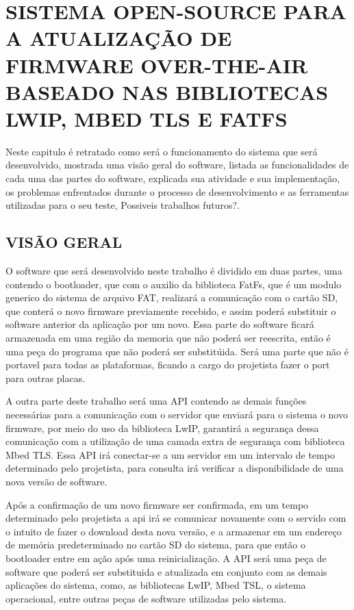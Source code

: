 
\chapter{SISTEMA OPEN-SOURCE PARA A ATUALIZAÇÃO DE FIRMWARE OVER-THE-AIR BASEADO NAS BIBLIOTECAS LWIP, MBED TLS E FATFS}
\label{chap:metodologia}
Neste capitulo é retratado como será o funcionamento do sistema que será desenvolvido, mostrada uma visão geral do software, listada as funcionalidades de cada uma das partes do software, explicada sua atividade e sua implementação, os problemas enfrentados durante o processo de desenvolvimento e as ferramentas utilizadas para o seu teste, Possiveis trabalhos futuros?. 

\section{VISÃO GERAL}
O software que será desenvolvido neste trabalho é dividido em duas partes, uma contendo o bootloader, que com o auxilio da biblioteca FatFs, que é um modulo generico do sistema de arquivo FAT, realizará a comunicação com o cartão SD, que conterá o novo firmware previamente recebido, e assim poderá substituir o software anterior da aplicação por um novo. Essa parte do software ficará armazenada em uma região da memoria que não poderá ser reescrita, então é uma peça do programa que não poderá ser substitúida. Será uma parte que não é portavel para todas as plataformas, ficando a cargo do projetista fazer o port para outras placas.

A outra parte deste trabalho será uma API contendo as demais funções necessárias para a comunicação com o servidor que enviará para o sistema o novo firmware, por meio do uso da biblioteca LwIP, garantirá a segurança dessa comunicação com a utilização de uma camada extra de segurança com biblioteca Mbed TLS. Essa API irá conectar-se a um servidor em um intervalo de tempo determinado pelo projetista, para consulta irá verificar a disponibilidade de uma nova versão de software. 

Após a confirmação de um novo firmware ser confirmada, em um tempo determinado pelo projetista a api irá se comunicar novamente com o servido com o intuito de fazer o download desta nova versão, e a armazenar em um endereço de memória predeterminado no cartão SD do sistema, para que então o bootloader entre em ação após uma reinicialização.
A API será uma peça de software que poderá ser substituida e atualizada em conjunto com as demais aplicações do sistema, como, as bibliotecas LwIP, Mbed TSL, o sistema operacional, entre outras peças de software utilizadas pelo sistema. 

